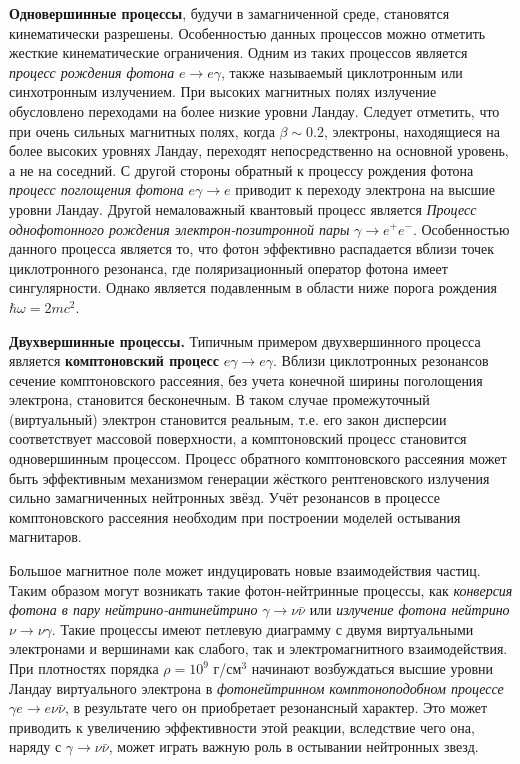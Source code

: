 \documentclass[12pt]{article}
\begin{document}
{\bf Одновершинные процессы}, будучи в замагниченной среде, становятся кинематически разрешены. Особенностью данных процессов можно отметить жесткие кинематические ограничения. Одним из таких процессов является \textit{процесс рождения фотона} $e\to e\gamma $, также называемый циклотронным или синхотронным излучением.  При высоких магнитных полях излучение обусловлено переходами на более низкие уровни Ландау. Следует отметить, 
что при очень сильных магнитных полях, когда $\beta\sim0.2$, электроны, находящиеся на более высоких уровнях Ландау, переходят непосредственно на основной уровень, а не на соседний. С другой стороны обратный к процессу рождения фотона \textit{процесс поглощения фотона} $e\gamma \to e$  приводит к переходу электрона на высшие уровни Ландау. Другой немаловажный квантовый процесс является \textit{Процесс однофотонного рождения электрон-позит\-ронной пары} $\gamma \to e^+e^-$. Особенностью данного процесса является то, что фотон эффективно распадается вблизи точек циклотронного резонанса, где поляризационный оператор фотона имеет сингулярности. 
Однако является подавленным в области ниже порога рождения $\hbar \omega = 2mc^2$.
		
{\bf Двухвершинные процессы.} Типичным примером двухвершинного процесса является {\bfseries комптоновский процесс}  $e \gamma \to e\gamma$. Вблизи циклотронных резонансов сечение комптоновского рассеяния, без учета 
конечной ширины поголощения электрона, становится бесконечным. В таком случае промежуточный (виртуальный) электрон становится реальным, т.е. его закон дисперсии соответствует массовой поверхности, 
а комптоновский процесс становится одновершинным процессом. Процесс обратного комптоновского рассеяния может быть эффективным механизмом генерации жёсткого рентгеновского излучения сильно замагниченных 
нейтронных звёзд. Учёт резонансов в процессе комптоновского рассеяния необходим при построении моделей остывания магнитаров.

Большое магнитное поле может индуцировать новые взаимодействия частиц. Таким образом могут возникать такие фотон-нейтринные процессы, как \textit{конверсия фотона в пару нейтрино-антинейтрино} 
$\gamma \to \nu \bar{\nu}$ или \textit{излучение фотона нейтрино} $\nu \to \nu \gamma$. Такие процессы имеют петлевую диаграмму с двумя виртуальными электронами и вершинами как слабого, так и электромагнитного взаимодействия. 
При плотностях порядка $\rho = 10^9$ г/см$^3$ начинают возбуждаться высшие уровни Ландау виртуального электрона в \textit{фотонейтринном комптоноподобном процессе} $\gamma e \to e\nu \bar{\nu}$,
в результате чего он приобретает резонансный характер. Это может приводить к увеличению эффективности этой реакции, вследствие чего она, наряду с $\gamma \to \nu \bar{\nu}$, может играть важную роль
 в остывании нейтронных звезд.
 
\end{document}
